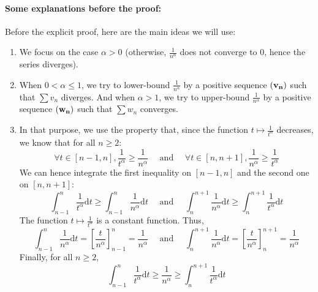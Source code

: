 \documentclass[notitlepage]{math}
\begin{document}
\paragraph{Some explanations before the proof:}
Before the explicit proof, here are the main ideas we will use:
\begin{enumerate}
    \item We focus on the case $\alpha > 0$ (otherwise, $\frac{1}{n^\alpha}$ does not converge to $0$, hence the series diverges).
    \item When $0 < \alpha \leq 1$, we try to lower-bound $\frac{1}{n^\alpha}$ by a positive sequence $\bf (v_n)$ such that $\sum v_n$ diverges.
    And when $\alpha > 1$, we try to upper-bound $\frac{1}{n^\alpha}$ by a positive sequence $\bf (w_n)$ such that $\sum w_n$ converges.
    \item In that purpose, we use the property that, since the function $t \mapsto \frac{1}{t^\alpha}$ decreases, we know that for all $n \geq 2$:
    \[ \forall t \in [n-1, n], \frac{1}{t^\alpha} \geq \frac{1}{n^\alpha} \quad \text{ and } \quad \forall t \in [n, n+1], \frac{1}{n^\alpha} \geq \frac{1}{t^\alpha} \]
    We can hence integrate the first inequality on $[n-1, n]$ and the second one on $[n, n+1]$:
    \[\int_{n-1}^n \frac{1}{t^\alpha} \mathrm{d}t \geq \int_{n-1}^n \frac{1}{n^\alpha} \mathrm{d}t \quad \text{ and } \quad \int_n^{n+1} \frac{1}{n^\alpha} \mathrm{d}t \geq \int_n^{n+1} \frac{1}{t^\alpha} \mathrm{d}t\]
    The function $t \mapsto \frac{1}{t^\alpha}$ is a constant function. Thus,
    \[ \int_{n-1}^n \frac{1}{n^\alpha} \mathrm{d}t = \left[\frac{t}{n^\alpha}\right]_{n-1}^n = \frac{1}{n^\alpha} \quad \text{ and } \quad \int_n^{n+1} \frac{1}{n^\alpha} \mathrm{d}t = \left[\frac{t}{n^\alpha}\right]_n^{n+1} = \frac{1}{n^\alpha} \]
    Finally, for all $n \geq 2$,
    \[ \int_{n-1}^n \frac{1}{t^\alpha} \mathrm{d}t \geq \frac{1}{n^\alpha} \geq \int_n^{n+1} \frac{1}{t^\alpha} \mathrm{d}t \]
    


\end{enumerate}
\end{document}
